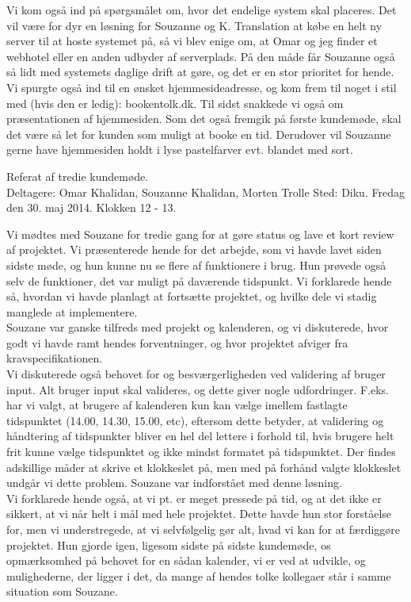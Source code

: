 \documentclass[12pt]{article}   %
\begin{document}
Vi kom også ind på spørgsmålet om, hvor det endelige system skal placeres. Det vil være for dyr en løsning for Souzanne og K. Translation at købe en helt ny server til at hoste systemet på, så vi blev enige om, at Omar og jeg finder et webhotel eller en anden udbyder af serverplads. På den måde får Souzanne også så lidt med systemets daglige drift at gøre, og det er en stor prioritet for hende. Vi spurgte også ind til en ønsket hjemmesideadresse, og kom frem til noget i stil med (hvis den er ledig): bookentolk.dk.  
Til sidst snakkede vi også om præsentationen af hjemmesiden. Som det også fremgik på første kundemøde, skal det være så let for kunden som muligt at booke en tid. Derudover vil Souzanne gerne have hjemmesiden holdt i lyse pastelfarver evt. blandet med sort.

\newpage

Referat af tredie kundemøde.\\

Deltagere: Omar Khalidan, Souzanne Khalidan, Morten Trolle
Sted: Diku. Fredag den 30. maj 2014. Klokken 12 - 13.

Vi mødtes med Souzane for tredie gang for at gøre status og lave et kort review af projektet. Vi præsenterede hende for det arbejde, som vi havde lavet siden sidste møde, og hun kunne nu se flere af funktionere i brug. Hun prøvede også selv de funktioner, det var muligt på daværende tidspunkt. Vi forklarede hende så, hvordan vi havde planlagt at fortsætte projektet, og hvilke dele vi stadig manglede at implementere. \\
Souzane var ganske tilfreds med projekt og kalenderen, og vi diskuterede, hvor godt vi havde ramt hendes forventninger, og hvor projektet afviger fra kravspecifikationen. \\
Vi diskuterede også behovet for og besværgerligheden ved validering af bruger input. Alt bruger input skal valideres, og dette giver nogle udfordringer. F.eks. har vi valgt, at brugere  af kalenderen kun kan vælge imellem fastlagte tidspunktet (14.00, 14.30, 15.00, etc), eftersom dette betyder, at validering og håndtering af tidspunkter bliver en hel del lettere i forhold til, hvis brugere helt frit kunne vælge tidspunktet og ikke mindst formatet på tidspunktet. Der findes adskillige måder at skrive et klokkeslet på, men med på forhånd valgte klokkeslet undgår vi dette problem. Souzane var indforstået med denne løsning. \\ 
Vi forklarede hende også, at vi pt. er meget pressede på tid, og at det ikke er sikkert, at vi når helt i mål med hele projektet. Dette havde hun stor forståelse for, men vi understregede, at vi selvfølgelig gør alt, hvad vi kan for at færdiggøre projektet. Hun gjorde igen, ligesom sidste på sidste kundemøde, os opmærksomhed på behovet for en sådan kalender, vi er ved at udvikle, og mulighederne, der ligger i det, da mange af hendes tolke kollegaer står i samme situation som Souzane.  
\newpage
\end{document}
